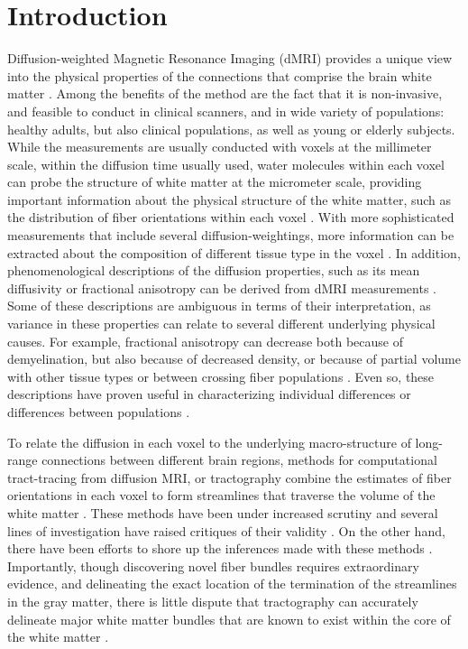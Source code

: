 \section*{Introduction}

\begin{itemize}

Diffusion-weighted Magnetic Resonance Imaging (dMRI) provides a unique view into
the physical properties of the connections that comprise the brain white matter
\cite{wandell2016clarifying}. Among the benefits of the method are the fact that
it is non-invasive, and feasible to conduct in clinical scanners, and in wide
variety of populations: healthy adults, but also clinical populations, as well
as young or elderly subjects. While the measurements are usually conducted with
voxels at the millimeter scale, within the diffusion time usually used, water
molecules within each voxel can probe the structure of white matter at the
micrometer scale, providing important information about the physical structure
of the white matter, such as the distribution of fiber orientations within each
voxel \cite{Frank2002-iz, Frank2001-xf}. With more sophisticated measurements
that include several diffusion-weightings, more information can be extracted
about the composition of different tissue type in the voxel
\cite{Jeurissen2014-ab, Kaden2016-ho}. In addition, phenomenological
descriptions of the diffusion properties, such as its mean diffusivity or
fractional anisotropy can be derived from dMRI measurements
\cite{Pierpaoli1996-vj}. Some of these descriptions are ambiguous in terms of
their interpretation, as variance in these properties can relate to several
different underlying physical causes. For example, fractional anisotropy can
decrease both because of demyelination, but also because of decreased density,
or because of partial volume with other tissue types or between crossing fiber
populations \cite{Beaulieu1996-fn, Beaulieu2002-tl}. Even so, these descriptions
have proven useful in characterizing individual differences or differences
between populations \cite{}.

To relate the diffusion in each voxel to the underlying macro-structure of
long-range connections between different brain regions, methods for
computational tract-tracing from diffusion MRI, or tractography combine the
estimates of fiber orientations in each voxel to form streamlines that traverse
the volume of the white matter \cite{Conturo1999-je, Mori2002-qi}. These methods
have been under increased scrutiny and several lines of investigation have
raised critiques of their validity \cite{Maier-Hein2017-vb, Thomas2014-ki}. On
the other hand, there have been efforts to shore up the inferences made with
these methods \cite{Pestilli2014NatMeth, Takemura2016-sh, Smith2013-nc,
Smith2015-cx, Smith2015-zt, Rheault2018-wk}. Importantly, though discovering
novel fiber bundles requires extraordinary evidence, and delineating the exact
location of the termination of the streamlines in the gray matter, there is
little dispute that tractography can accurately delineate major white matter
bundles that are known to exist within the core of the white matter
.


\end{itemize}
